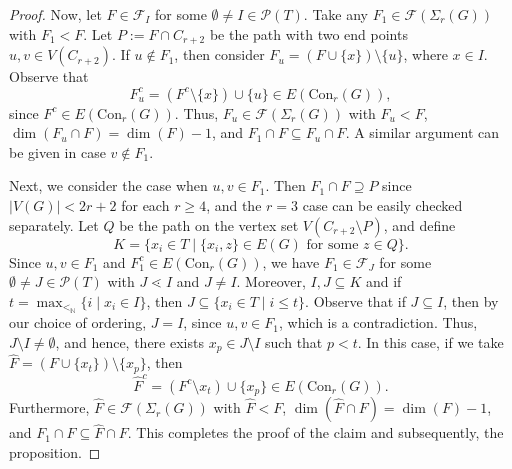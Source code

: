 \documentclass[12pt,reqno]{amsart}
\theoremstyle{definition}
\newcommand{\Con}{{\mathrm{Con}}}
\def\F{\mathcal{F}}
\begin{document}
\begin{proof}
		 Now, let $F\in \F_I$ for some $\emptyset\neq I\in\mathcal P(T)$. Take any $F_1\in \F(\Sigma_{r}(G))$ with $F_1<F$. Let $P:=F\cap C_{r+2}$ be the path with two end points $u,v\in V(C_{r+2})$. If $u\notin F_1$, then consider $F_u=(F\cup\{x\})\setminus\{u\}$, where $x\in I$. Observe that
		  \[F_u^c=(F^c\setminus\{x\})\cup\{u\}\in E(\Con_r(G)),\]
		   since $F^c\in E(\Con_r(G))$. Thus, $F_u\in \F(\Sigma_{r}(G))$ with $F_u<F$, $\dim(F_u\cap F)=\dim(F)-1$, and $F_1\cap F\subseteq F_u\cap F$. A similar argument can be given in case $v\notin F_1$.
		   
		   Next, we consider the case when $u,v\in F_1$. Then $F_1\cap F\supseteq P$ since $|V(G)|<2r+2$ for each $r\ge 4$, and the $r=3$ case can be easily checked separately. Let $Q$ be the path on the vertex set $V(C_{r+2}\setminus P)$, and define
		   \[
		   K=\{x_i\in T\mid \{x_i,z\}\in E(G)\text{ for some }z\in Q\}.
		   \]
		   Since $u,v\in F_1$ and $F_1^c\in E(\Con_r(G))$, we have $F_1\in \F_J$ for some $\emptyset\neq J\in \mathcal P(T)$ with $J\lessdot I$ and $J\neq I$. Moreover, $I,J\subseteq K$ and if $t=\max_{<_{\mathbb N}}\{i\mid x_i\in I\}$, then $J\subseteq \{x_i\in T\mid i\le t\}$. Observe that if $J\subseteq I$, then by our choice of ordering, $J=I$, since $u,v\in F_1$, which is a contradiction. Thus, $J\setminus I\neq\emptyset$, and hence, there exists $x_p\in J\setminus I$ such that $p<t$. In this case, if we take $\widehat F=(F\cup\{x_t\})\setminus\{x_p\}$, then 
		   \[
		   \widehat{F}^c=(F^c\setminus x_t)\cup\{x_p\}\in E(\Con_r(G)).
		   \]
		   Furthermore, $\widehat F\in \F(\Sigma_{r}(G))$ with $\widehat F<F$, $\dim(\widehat F\cap F)=\dim(F)-1$, and $F_1\cap F\subseteq \widehat F\cap F$. This completes the proof of the claim and subsequently, the proposition.
	\end{proof}
\end{document}
